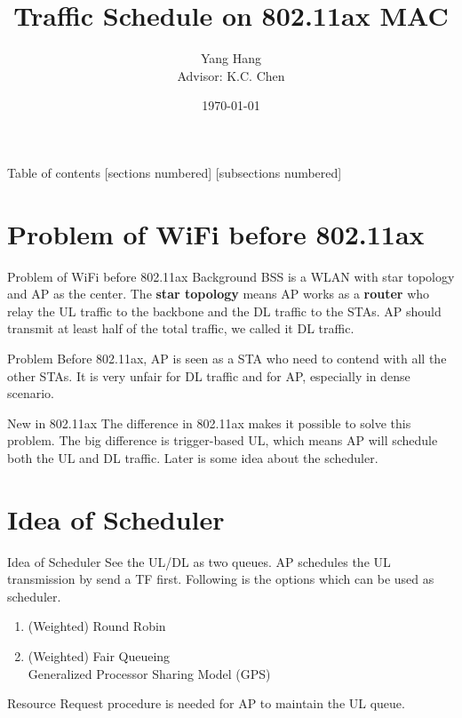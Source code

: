 \documentclass[10pt]{beamer}
\title{Traffic Schedule on 802.11ax MAC}
\date{\today}
\author{Yang Hang \\ Advisor: K.C. Chen}
\institute{Gratitude Institute of Communication Engineering }
\begin{document}
\maketitle
\begin{frame}{Table of contents}
	[sections numbered]
    [subsections numbered]
\setcounter{tocdepth}{5}
\setcounter{secnumdepth}{5} 
    \tableofcontents%
\end{frame}

\section{Problem of WiFi before 802.11ax}
\begin{frame}{Problem of WiFi before 802.11ax}
\alert{Background}
BSS is a WLAN with star topology and AP as the center. 
The \textbf{star topology} means AP works as a \textbf{router} who relay the UL traffic to the backbone and the DL traffic to the STAs. 
AP should transmit at least half of the total traffic, we called it DL traffic. 

\alert{Problem} 
Before 802.11ax, AP is seen as a STA who need to contend with all the other STAs. It is very unfair for DL traffic and for AP, especially in dense scenario. 

\alert{New in 802.11ax}
The difference in 802.11ax makes it possible to solve this problem. 
The big difference is trigger-based UL, which means AP will schedule both the UL and DL traffic. 
Later is some idea about the scheduler.  
\end{frame}

\section{Idea of Scheduler}
\begin{frame}{Idea of Scheduler}
See the UL/DL as two queues. AP schedules the UL transmission by send a TF first. 
Following is the options which can be used as scheduler. 
\begin{enumerate}
\item (Weighted) Round Robin
\item (Weighted) Fair Queueing\\
 Generalized Processor Sharing Model (GPS)
\end{enumerate}
Resource Request procedure is needed for AP to maintain the UL queue. 
\end{frame}

%    
%    

    
\end{document}
